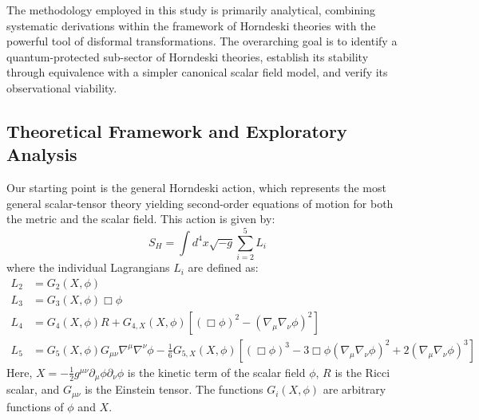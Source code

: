 \documentclass[twocolumn]{aastex631}
\begin{document}
The methodology employed in this study is primarily analytical, combining systematic derivations within the framework of Horndeski theories with the powerful tool of disformal transformations. The overarching goal is to identify a quantum-protected sub-sector of Horndeski theories, establish its stability through equivalence with a simpler canonical scalar field model, and verify its observational viability.

\subsection{Theoretical Framework and Exploratory Analysis}
Our starting point is the general Horndeski action, which represents the most general scalar-tensor theory yielding second-order equations of motion for both the metric and the scalar field. This action is given by:
\begin{equation}
S_H = \int d^4x \sqrt{-g} \sum_{i=2}^{5} L_i
\end{equation}
where the individual Lagrangians $L_i$ are defined as:
\begin{align*}
L_2 &= G_2(X, \phi) \\
L_3 &= G_3(X, \phi) \Box\phi \\
L_4 &= G_4(X, \phi) R + G_{4,X}(X, \phi) [(\Box\phi)^2 - (\nabla_\mu\nabla_\nu\phi)^2] \\
L_5 &= G_5(X, \phi) G_{\mu\nu} \nabla^\mu\nabla^\nu\phi - \frac{1}{6} G_{5,X}(X, \phi) [(\Box\phi)^3 - 3\Box\phi(\nabla_\mu\nabla_\nu\phi)^2 + 2(\nabla_\mu\nabla_\nu\phi)^3]
\end{align*}
Here, $X = -\frac{1}{2} g^{\mu\nu}\partial_\mu\phi\partial_\nu\phi$ is the kinetic term of the scalar field $\phi$, $R$ is the Ricci scalar, and $G_{\mu\nu}$ is the Einstein tensor. The functions $G_i(X, \phi)$ are arbitrary functions of $\phi$ and $X$.
\end{document}
